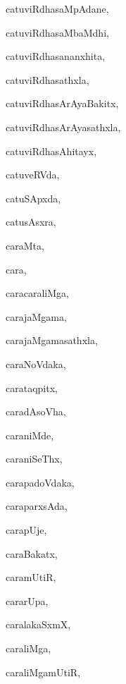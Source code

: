 \begin{multicols}{3}
{\noindent
{catuviRdhasaMpAdane}, \pageref{catuviRdhasaMpAdane}

\noindent
{catuviRdhasaMbaMdhi}, \pageref{catuviRdhasaMbaMdhi}

\noindent
{catuviRdhasananxhita}, \pageref{catuviRdhasananxhita}

\noindent
{catuviRdhasathxla}, \pageref{catuviRdhasathxla}

\noindent
{catuviRdhasArAyaBakitx}, \pageref{catuviRdhasArAyaBakitx}

\noindent
{catuviRdhasArAyasathxla}, \pageref{catuviRdhasArAyasathxla}

\noindent
{catuviRdhasAhitayx}, \pageref{catuviRdhasAhitayx}

\noindent
{catuveRVda}, \pageref{catuveRVda}

\noindent
{catuSApxda}, \pageref{catuSApxda}

\noindent
{catusAsxra}, \pageref{catusAsxra}

\noindent
{caraMta}, \pageref{caraMta}

\noindent
{cara}, \pageref{cara}

\noindent
{caracaraliMga}, \pageref{caracaraliMga}

\noindent
{carajaMgama}, \pageref{carajaMgama}

\noindent
{carajaMgamasathxla}, \pageref{carajaMgamasathxla}

\noindent
{caraNoVdaka}, \pageref{caraNoVdaka}

\noindent
{carataqpitx}, \pageref{carataqpitx}

\noindent
{caradAsoVha}, \pageref{caradAsoVha}

\noindent
{caraniMde}, \pageref{caraniMde}

\noindent
{caraniSeThx}, \pageref{caraniSeThx}

\noindent
{carapadoVdaka}, \pageref{carapadoVdaka}

\noindent
{caraparxsAda}, \pageref{caraparxsAda}

\noindent
{carapUje}, \pageref{carapUje}

\noindent
{caraBakatx}, \pageref{caraBakatx}

\noindent
{caramUtiR}, \pageref{caramUtiR}

\noindent
{cararUpa}, \pageref{cararUpa}

\noindent
{caralakaSxmX}, \pageref{caralakaSxmX}

\noindent
{caraliMga}, \pageref{caraliMga}

\noindent
{caraliMgamUtiR}, \pageref{caraliMgamUtiR}

}
\end{multicols}
